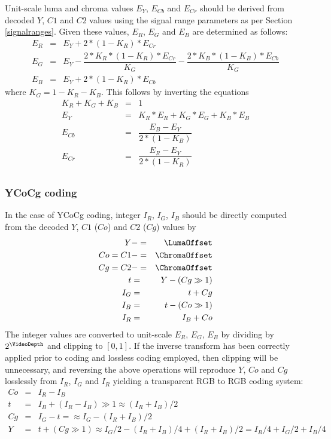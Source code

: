 \begin{informative*}
Unit-scale luma and chroma values $E_Y$, $E_{Cb}$ and $E_{Cr}$ should be
derived from decoded $Y$, $C1$ and $C2$ values using the signal range parameters
as per Section \ref{signalranges}. Given these values, $E_R$, $E_G$ and $E_B$ are
determined as follows:
\begin{eqnarray*}
E_R & = & E_Y + 2*(1-K_R)*E_{Cr} \\
E_G & = & E_Y - \dfrac{2*K_R*(1-K_R)*E_{Cr}}{K_G}-\dfrac{2*K_B*(1-K_B)*E_{Cb}}{K_G} \\
E_B & = & E_Y + 2*(1-K_R)*E_{Cb} 
\end{eqnarray*}
where $K_G=1-K_R-K_B$.
This follows by inverting the equations 
\begin{eqnarray*}
K_R+K_G+K_B & = & 1 \\
E_Y & = & K_R*E_R+K_G*E_G+K_B*E_B \\
E_{Cb} & = & \dfrac{E_B - E_Y}{2*(1-K_B)} \\
E_{Cr} & = & \dfrac{E_R - E_Y}{2*(1-K_R)} \\
\end{eqnarray*}

\subsubsection{YCoCg coding}
In the case of YCoCg coding, integer $I_R$, $I_G$, $I_B$ should be directly computed from
the decoded $Y$, $C1$ ($Co$) and $C2$ ($Cg$) values by
\begin{eqnarray*}
Y & -= & \LumaOffset \\
Co=C1 & -= & \ChromaOffset \\
Cg=C2 & -= & \ChromaOffset \\
t & = & Y-(Cg\gg1) \\
I_G & = & t+Cg \\
I_B & = & t-(Co\gg1) \\
I_R & = & I_B+Co
\end{eqnarray*}
The integer values are converted to unit-scale $E_R$, $E_G$, $E_B$ by dividing by 
$2^\VideoDepth$ and clipping to $[0,1]$.
If the inverse transform has been correctly
applied prior to coding and lossless coding employed, then clipping will
be unnecessary, and reversing the above operations will reproduce $Y$, $Co$ and $Cg$
losslessly from $I_R$, $I_G$ and $I_R$ yielding a transparent RGB to RGB coding system:
\begin{eqnarray*}
Co & = & I_R-I_B \\
t & = & I_B+(I_R-I_B)\gg1 \approx (I_R+I_B)/2\\
Cg & = & I_G-t = \approx I_G-(I_R+I_B)/2\\
Y & = & t+(Cg\gg1) \approx I_G/2-(I_R+I_B)/4+(I_R+I_B)/2=I_R/4+I_G/2+I_B/4
\end{eqnarray*}


\end{informative*}
